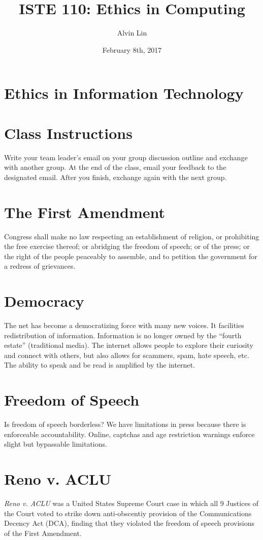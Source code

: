 \documentclass[letterpaper, 12pt]{article}
\title{ISTE 110: Ethics in Computing}
\author{Alvin Lin}
\date{February 8th, 2017}
\begin{document}
\maketitle

\section*{Ethics in Information Technology}

\section*{Class Instructions}
Write your team leader's email on your group discussion outline and exchange
with another group. At the end of the class, email your feedback to the
designated email. After you finish, exchange again with the next group.

\section*{The First Amendment}
Congress shall make no law respecting an establishment of religion, or
prohibiting the free exercise thereof; or abridging the freedom of speech; or
of the press; or the right of the people peaceably to assemble, and to petition
the government for a redress of grievances.

\section*{Democracy}
The net has become a democratizing force with many new voices. It facilities
redistribution of information. Information is no longer owned by the ``fourth
estate'' (traditional media). The internet allows people to explore their
curiosity and connect with others, but also allows for scammers, spam, hate
speech, etc. The ability to speak and be read is amplified by the internet.

\section*{Freedom of Speech}
Is freedom of speech borderless? We have limitations in press because there is
enforceable accountability. Online, captchas and age restriction warnings
enforce slight but bypassable limitations.

\section*{Reno v. ACLU}
\textit{Reno v. ACLU} was a United States Supreme Court case in which all 9
Justices of the Court voted to strike down anti-obscentiy provision of the
Communications Decency Act (DCA), finding that they violated the freedom of
speech provisions of the First Amendment.
\end{document}
